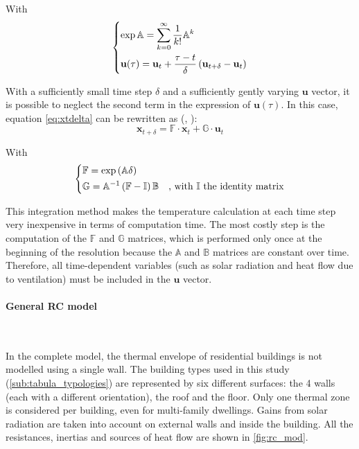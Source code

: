 \documentclass[11pt]{article}
\begin{document}
        \noindent
        With
        $$
        \begin{dcases}
          \exp \mathbb{A}= \sum_{k=0}^\infty \frac{1}{k!}\mathbb{A}^k\\
          \mathbf{u}(\tau)= \mathbf{u}_t + \frac{\tau-t}{\delta}\left(\mathbf{u}_{t+\delta}-\mathbf{u}_t\right)\\
        \end{dcases}
        $$

        With a sufficiently small time step $\delta$ and a sufficiently gently varying $\mathbf{u}$ vector, it is possible to neglect the second term in the expression of $\mathbf{u}(\tau)$. In this case, equation \eqref{eq:xtdelta} can be rewritten as (\cite{seem_transfer_1989}, \cite{madsen_estimation_1995}): 
        \begin{equation}\label{eq:xtfg}
            \mathbf{x}_{t+\delta} = \mathbb{F}\cdot\mathbf{x}_{t} + \mathbb{G}\cdot\mathbf{u}_{t}
        \end{equation}
        
        \noindent
        With
        $$
        \begin{dcases}
          \mathbb{F} = \exp\left(\mathbb{A}\delta\right)\\
          \mathbb{G}= \mathbb{A}^{-1}\left(\mathbb{F}-\mathbb{I}\right)\mathbb{B}&\text{, with $\mathbb{I}$ the identity matrix}\\
        \end{dcases}
        $$

        This integration method makes the temperature calculation at each time step very inexpensive in terms of computation time. The most costly step is the computation of the $\mathbb{F}$ and $\mathbb{G}$ matrices, which is performed only once at the beginning of the resolution because the $\mathbb{A}$ and $\mathbb{B}$ matrices are constant over time. Therefore, all time-dependent variables (such as solar radiation and heat flow due to ventilation) must be included in the $\mathbf{u}$ vector. 
        
        

        \paragraph{General RC model}\mbox{}\\ %
        \label{par:general_rc_model}
        
        In the complete model, the thermal envelope of residential buildings is not modelled using a single wall. The building types used in this study (\ref{sub:tabula_typologies}) are represented by six different surfaces: the 4 walls (each with a different orientation), the roof and the floor. Only one thermal zone is considered per building, even for multi-family dwellings. Gains from solar radiation are taken into account on external walls and inside the building. All the resistances, inertias and sources of heat flow are shown in \ref{fig:rc_mod}.\\ 
\end{document}
